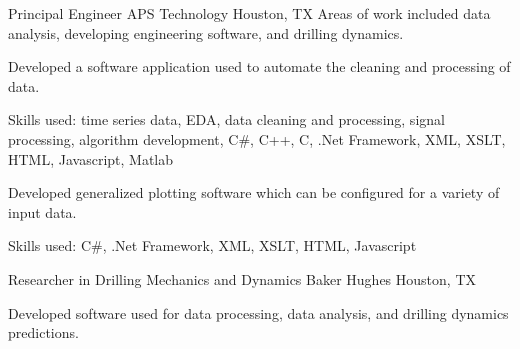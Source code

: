 \documentclass{leresume}
\begin{document}
            {Principal Engineer}
            {APS Technology}
			{Houston, TX}
			Areas of work included data analysis, developing engineering software, and drilling dynamics.\nolinebreak[4]
		\begin{bulletedlist}
			
		\item
		
					Developed a software application used to automate the cleaning and processing of data.
				
		\begin{bulletedlist}
			
		\item
		
						Skills used: time series data, EDA, data cleaning and processing, signal processing, algorithm development, C\#, C++, C, .Net Framework, XML, XSLT, HTML, Javascript, Matlab
					
		\end{bulletedlist}
	
		\item
		
					Developed generalized plotting software which can be configured for a variety of input data.
				
		\begin{bulletedlist}
			
		\item
		
						Skills used: C\#, .Net Framework, XML, XSLT, HTML, Javascript
					
		\end{bulletedlist}
	
		\end{bulletedlist}
	
            {Researcher in Drilling Mechanics and Dynamics}
            {Baker Hughes}
			{Houston, TX}
			
				Developed software used for data processing, data analysis, and drilling dynamics predictions.
			
\end{document}
